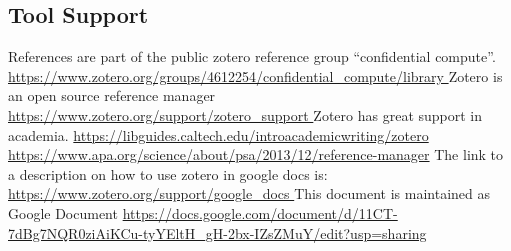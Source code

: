\subsection{Tool Support}

References are part of the public zotero reference group  “confidential compute”.
\url{https://www.zotero.org/groups/4612254/confidential_compute/library }
Zotero is an open source reference manager
\url{https://www.zotero.org/support/zotero_support }
Zotero has great support in academia.
\url{https://libguides.caltech.edu/introacademicwriting/zotero }
\url{https://www.apa.org/science/about/psa/2013/12/reference-manager}
The link to a description on how to use zotero in google docs is:
\url{https://www.zotero.org/support/google_docs }
This document is maintained as Google Document
\url{https://docs.google.com/document/d/11CT-7dBg7NQR0ziAiKCu-tyYEltH_gH-2bx-IZsZMuY/edit?usp=sharing}


